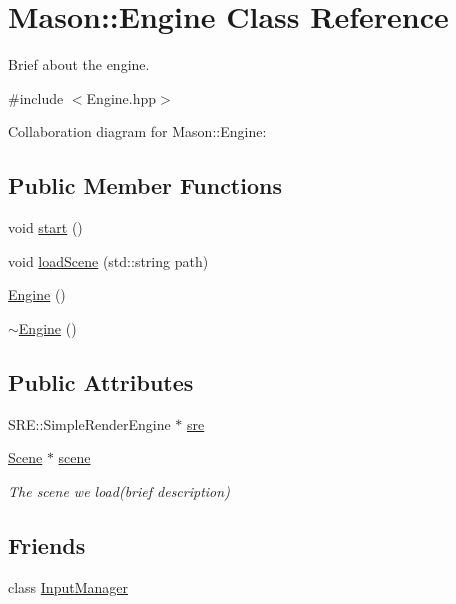 \hypertarget{class_mason_1_1_engine}{}\section{Mason\+:\+:Engine Class Reference}
\label{class_mason_1_1_engine}


Brief about the engine.  




{\ttfamily \#include $<$Engine.\+hpp$>$}



Collaboration diagram for Mason\+:\+:Engine\+:
\subsection*{Public Member Functions}
\begin{DoxyCompactItemize}
\item 
void \hyperlink{class_mason_1_1_engine_a4d8066dd213a03f5420d1bf60f150ca7}{start} ()
\item 
void \hyperlink{class_mason_1_1_engine_ab7f05ee3e9f917f11ed0deb20d4508b0}{load\+Scene} (std\+::string path)
\item 
\hyperlink{class_mason_1_1_engine_a8c98683b0a3aa28d8ab72a8bcd0d52f2}{Engine} ()
\item 
\hyperlink{class_mason_1_1_engine_a8ef7030a089ecb30bbfcb9e43094717a}{$\sim$\+Engine} ()
\end{DoxyCompactItemize}
\subsection*{Public Attributes}
\begin{DoxyCompactItemize}
\item 
S\+R\+E\+::\+Simple\+Render\+Engine $\ast$ \hyperlink{class_mason_1_1_engine_a8b5ac2d43f0b366ff51c0908fe581f17}{sre}
\item 
\hyperlink{class_mason_1_1_scene}{Scene} $\ast$ \hyperlink{class_mason_1_1_engine_a2ec6bc225a9327484dde73bb8298ea85}{scene}
\begin{DoxyCompactList}\small\item\em The scene we load(brief description) \end{DoxyCompactList}\end{DoxyCompactItemize}
\subsection*{Friends}
\begin{DoxyCompactItemize}
\item 
class \hyperlink{class_mason_1_1_engine_af0e8c3dcc20b7ddcaf63506363a22821}{Input\+Manager}
\end{DoxyCompactItemize}


